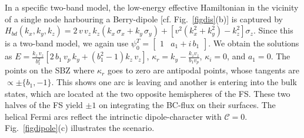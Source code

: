 \documentclass[aps,prl,twocolumn,nofootinbib,showkeys, nolongbibliography, 10pt]{revtex4-2}
\begin{document}
In a specific two-band model, the low-energy effective Hamiltonian in the vicinity of a single node harbouring a Berry-dipole [cf. Fig.~\ref{figdis}(b)] is captured by \cite{twoband-dipole}
$ H_{bd} (k_x, k_y, k_z)= 2\, v\, v_z \, k_z \left( k_x \, \sigma_x  +  k_y \,\sigma_y  \right )
+  \left [ v^2 \left( k_x^2 + k_y^2 \right) - k_z^2 \right ] \sigma_z $. 
Since this is a two-band model, we again use $ \psi_0^T  = \begin{bmatrix}
1 & a_1 +i \, b_1 \end{bmatrix}$. We obtain the solutions as $E =  \frac{k_z\, v_z}{b_1^2}
 \left[2 \,b_1 \,v_p \, k_y +\left(b_1^2-1\right) k_z \,v_z\right] $, 
$\kappa_r  =  k_y-\frac{k_z v_z}{b_1 v_p} $, $\kappa_i = 0$, and $a_1= 0 $.
The points on the SBZ where $\kappa_r$ goes to zero are antipodal points, whose tangents are $\propto \pm \lbrace  b_1, -1 \rbrace$. This shows one arc is leaving and another is entering into the bulk states, which are located at the two opposite hemispheres of the FS. These two halves of the FS yield $\pm 1$ on integrating the BC-flux on their surfaces. The helical Fermi arcs reflect the intrinctic dipole-character with $\mathcal C = 0$. Fig.~\ref{figdipole}(c) illustrates the scenario.
\end{document}
